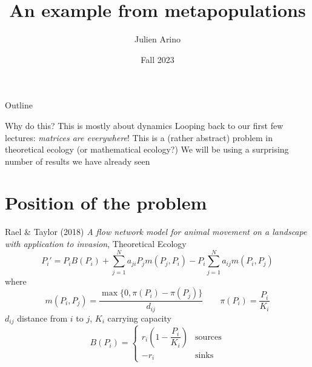 \documentclass[aspectratio=169]{beamer}
\title{An example from metapopulations}
\author{Julien Arino}
\date{Fall 2023}
\begin{document}
\begin{frame}
	\titlepage
\end{frame}
\addtocounter{page}{-1}
  
  
\begin{frame}{Outline}
	  \tableofcontents[hideallsubsections]
\end{frame}
\addtocounter{page}{-1}


\begin{frame}{Why do this?}
	This is mostly about dynamics
	\vfill
	Looping back to our first few lectures: \emph{matrices are everywhere}!
	\vfill
	This is a (rather abstract) problem in theoretical ecology (or mathematical ecology?)
	\vfill
	We will be using a surprising number of results we have already seen
\end{frame}

\section{Position of the problem}
\begin{frame}{Rael \& Taylor (2018)}
	{\footnotesize\emph{A flow network model for animal movement on a landscape with application to invasion}, Theoretical Ecology}
	\vfill
	\[
	P_i' = P_iB(P_i)+\sum_{j=1}^N 
	a_{ji}P_jm(P_j,P_i)
	-P_i\sum_{j=1}^N a_{ij}m(P_i,P_j)
	\]
	where
	\[
	m(P_i, P_j) = \frac{\max\{0, \pi(P_i)-\pi(P_j)\}}{d_{ij}}
	\qquad \pi(P_i) = \frac{P_i}{K_i}
	\]
	$d_{ij}$ distance from $i$ to $j$, $K_i$ carrying capacity
	\[
	B(P_i) = \begin{cases}
	r_i\left(1-\dfrac{P_i}{K_i}\right) & \textrm{sources} \\
	-r_i & \textrm{sinks}
	\end{cases}
	\]
\end{frame}
	
\end{document}
